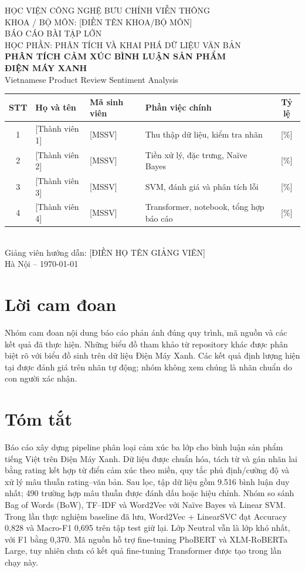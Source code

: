 \documentclass[12pt,a4paper,oneside]{report}
\begin{document}
\begin{titlepage}
  \centering
  {\large HỌC VIỆN CÔNG NGHỆ BƯU CHÍNH VIỄN THÔNG\\[0.25em]
  KHOA / BỘ MÔN: [ĐIỀN TÊN KHOA/BỘ MÔN]}\\[2.2cm]
  {\large BÁO CÁO BÀI TẬP LỚN}\\[0.5em]
  {\large HỌC PHẦN: PHÂN TÍCH VÀ KHAI PHÁ DỮ LIỆU VĂN BẢN}\\[1.6cm]
  {\Huge\bfseries\color{ptitblue} PHÂN TÍCH CẢM XÚC BÌNH LUẬN SẢN PHẨM\\[0.4em]
  ĐIỆN MÁY XANH}\\[0.5cm]
  {\Large Vietnamese Product Review Sentiment Analysis}\\[1.8cm]
  \begin{tabular}{|c|p{5.0cm}|p{2.4cm}|p{4.0cm}|c|}\hline
    \textbf{STT} & \textbf{Họ và tên} & \textbf{Mã sinh viên} & \textbf{Phần việc chính} & \textbf{Tỷ lệ}\\\hline
    1 & [Thành viên 1] & [MSSV] & Thu thập dữ liệu, kiểm tra nhãn & [\%]\\\hline
    2 & [Thành viên 2] & [MSSV] & Tiền xử lý, đặc trưng, Naïve Bayes & [\%]\\\hline
    3 & [Thành viên 3] & [MSSV] & SVM, đánh giá và phân tích lỗi & [\%]\\\hline
    4 & [Thành viên 4] & [MSSV] & Transformer, notebook, tổng hợp báo cáo & [\%]\\\hline
  \end{tabular}\\[1.0cm]
  {\large Giảng viên hướng dẫn: [ĐIỀN HỌ TÊN GIẢNG VIÊN]}\\[0.6cm]
  {\large Hà Nội -- \today}
\end{titlepage}

\chapter*{Lời cam đoan}
Nhóm cam đoan nội dung báo cáo phản ánh đúng quy trình, mã nguồn và các kết quả đã thực hiện. Những biểu đồ tham khảo từ repository khác được phân biệt rõ với biểu đồ sinh trên dữ liệu Điện Máy Xanh. Các kết quả định lượng hiện tại được đánh giá trên nhãn tự động; nhóm không xem chúng là nhãn chuẩn do con người xác nhận.

\chapter*{Tóm tắt}
Báo cáo xây dựng pipeline phân loại cảm xúc ba lớp cho bình luận sản phẩm tiếng Việt trên Điện Máy Xanh. Dữ liệu được chuẩn hóa, tách từ và gán nhãn lai bằng rating kết hợp từ điển cảm xúc theo miền, quy tắc phủ định/cường độ và xử lý mâu thuẫn rating--văn bản. Sau lọc, tập dữ liệu gồm 9.516 bình luận duy nhất; 490 trường hợp mâu thuẫn được đánh dấu hoặc hiệu chỉnh. Nhóm so sánh Bag of Words (BoW), TF--IDF và Word2Vec với Naïve Bayes và Linear SVM. Trong lần thực nghiệm baseline đã lưu, Word2Vec + LinearSVC đạt Accuracy 0,828 và Macro-F1 0,695 trên tập test giữ lại. Lớp Neutral vẫn là lớp khó nhất, với F1 bằng 0,370. Mã nguồn hỗ trợ fine-tuning PhoBERT và XLM-RoBERTa Large, tuy nhiên chưa có kết quả fine-tuning Transformer được tạo trong lần chạy này.
\end{document}
